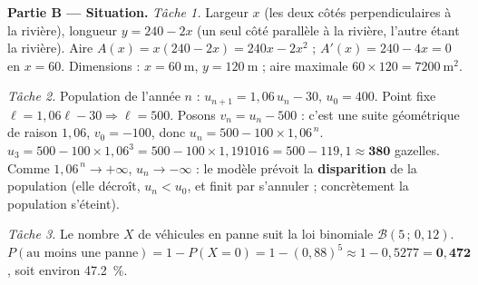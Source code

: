 \smallskip
\noindent\textbf{Partie B — Situation.}
\emph{Tâche 1.} Largeur $x$ (les deux côtés perpendiculaires à la rivière),
longueur $y=240-2x$ (un seul côté parallèle à la rivière, l'autre étant la rivière).
Aire $A(x)=x(240-2x)=240x-2x^2$ ; $A'(x)=240-4x=0$ en $x=60$. Dimensions :
$x=\SI{60}{\metre}$, $y=\SI{120}{\metre}$ ; aire maximale
$60\times120=\SI{7200}{\metre\squared}$.

\emph{Tâche 2.} Population de l'année $n$ : $u_{n+1}=1{,}06\,u_n-30$, $u_0=400$.
Point fixe $\ell=1{,}06\ell-30\Rightarrow\ell=500$. Posons $v_n=u_n-500$ : c'est une
suite géométrique de raison $1{,}06$, $v_0=-100$, donc $u_n=500-100\times1{,}06^{\,n}$.
$u_3=500-100\times1{,}06^3=500-100\times1{,}191016=500-119{,}1\approx\textbf{380}$
gazelles. Comme $1{,}06^{\,n}\to+\infty$, $u_n\to-\infty$ : le modèle prévoit la
\textbf{disparition} de la population (elle décroît, $u_n<u_0$, et finit par
s'annuler ; concrètement la population s'éteint).

\emph{Tâche 3.} Le nombre $X$ de véhicules en panne suit la loi binomiale
$\mathcal{B}(5\,;\,0{,}12)$. $P(\text{au moins une panne})=1-P(X=0)=1-(0{,}88)^5
\approx1-0{,}5277=\mathbf{0{,}472}$, soit environ \SI{47,2}{\percent}.
